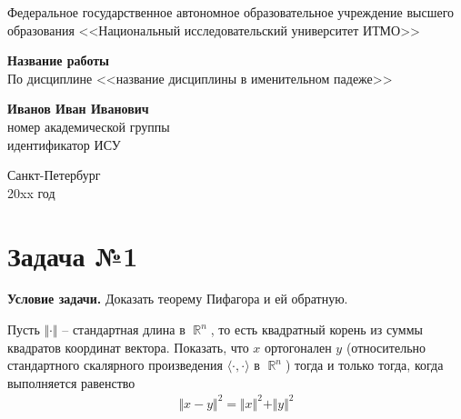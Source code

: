 \documentclass[12pt]{article}
\DeclareMathOperator{\R}{\mathbb{R}}
\begin{document}
\begin{titlepage}
    \begin{center}
        \large{Федеральное государственное автономное образовательное учреждение высшего образования <<Национальный исследовательский университет ИТМО>>}
    \end{center}
    
    \vspace{15em}
    
    \begin{center}
        \huge{\textbf{Название работы}} \\
        \large{По дисциплине <<название дисциплины в именительном падеже>>}
    \end{center}
    
    \vspace{5em}
    
    \begin{flushright}
        \Large{\textbf{Иванов Иван Иванович}} \\
        \Large{номер академической группы} \\
        \Large{идентификатор ИСУ}
    \end{flushright}
    
    \vspace{15em}
    
    \begin{center}
        Санкт-Петербург \\
        20xx год
    \end{center}
\end{titlepage}

\tableofcontents
\newpage

\section*{Задача №1}

\textbf{Условие задачи.} Доказать теорему Пифагора и ей обратную.

Пусть 
$\Vert\cdot\Vert$ -- стандартная длина в $\R^n$, то есть квадратный корень из суммы квадратов координат вектора. Показать, что
$x$ ортогонален $y$ (относительно стандартного скалярного произведения $\langle\cdot, \cdot\rangle$ в $\R^n$) тогда и только тогда,
когда выполняется равенство
\begin{gather}
    \label{PythagoreanTheorem}
    \Vert x - y \Vert^2 = \Vert x \Vert^2 + \Vert y \Vert^2
\end{gather}
\end{document}
